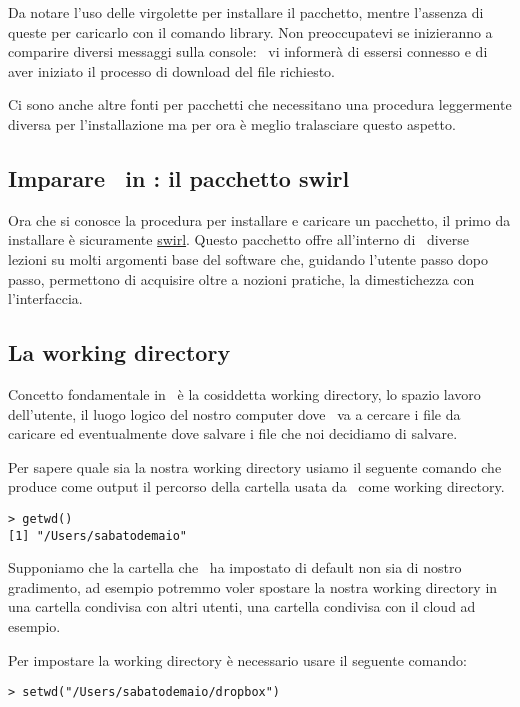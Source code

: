 Da notare l'uso delle virgolette per installare il pacchetto, mentre l'assenza di queste per caricarlo con il comando \textsf{library}. Non preoccupatevi se inizieranno a comparire diversi messaggi sulla console: \erre\ vi informerà di essersi connesso e di aver iniziato il processo di download del file richiesto.

Ci sono anche altre fonti per pacchetti che necessitano una procedura leggermente diversa per l'installazione ma per ora è meglio tralasciare questo aspetto.

\subsection{Imparare \erre\ in \erre: il pacchetto swirl}

Ora che si conosce la procedura per installare e caricare un pacchetto, il primo da installare è sicuramente \href{http://swirlstats.com}{swirl}. Questo pacchetto offre all'interno di \erre\ diverse lezioni su molti argomenti base del software che, guidando l'utente passo dopo passo, permettono di acquisire oltre a nozioni pratiche, la dimestichezza con l'interfaccia.

\subsection{La working directory}

Concetto fondamentale in \erre\ è la cosiddetta working directory, lo spazio lavoro dell'utente, il luogo logico del nostro computer dove \erre\ va a cercare i file da caricare ed eventualmente dove salvare i file che noi decidiamo di salvare.

Per sapere quale sia la nostra working directory usiamo il seguente comando che produce come output il percorso della cartella usata da \erre\ come working directory.

\begin{lstlisting}
> getwd()
[1] "/Users/sabatodemaio"
\end{lstlisting}

Supponiamo che la cartella che \erre\ ha impostato di default non sia di nostro gradimento, ad esempio potremmo voler spostare la nostra working directory in una cartella condivisa con altri utenti, una cartella condivisa con il cloud ad esempio.

Per impostare la working directory è necessario usare il seguente comando:

\begin{lstlisting}
> setwd("/Users/sabatodemaio/dropbox")
\end{lstlisting}

